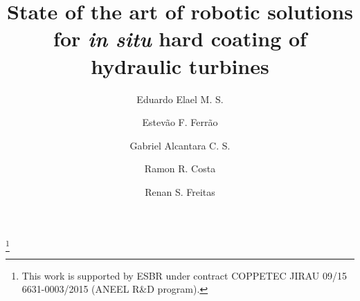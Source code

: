 \documentclass{main}
\begin{document}
\begin{frontmatter}

\title{State of the art of robotic solutions for \textit{in situ} hard coating
of hydraulic turbines} 

\thanks[footnoteinfo]{This work is supported by ESBR under contract COPPETEC
JIRAU 09/15 6631-0003/2015 (ANEEL R\&D program).}

\author[1]{Eduardo Elael M. S.}
\author[1]{Estevão F. Ferrão} 
\author[1]{Gabriel Alcantara C. S.}
\author[1]{Ramon R. Costa}
\author[1]{Renan S. Freitas}

\address[1]{Department of Electrical Engineering, COPPE UFRJ, Rio de Janeiro, Brasil} 
  
\begin{abstract}                %
\end{abstract} 
 
\begin{keyword}
\end{keyword}

\end{frontmatter}

 




  
 
\appendix
\end{document}
